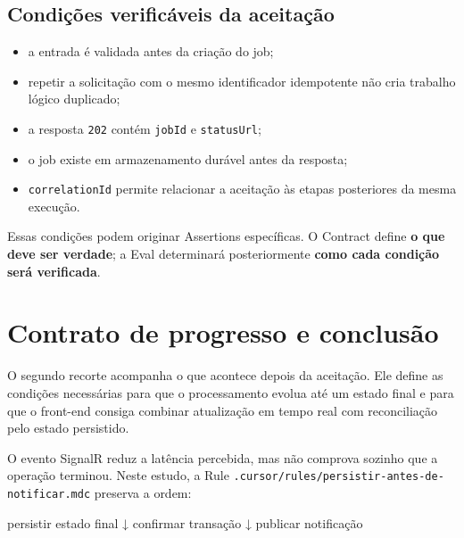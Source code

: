 \documentclass[
  10pt,
  a4paper,
  oneside]{book}
\newenvironment{Shaded}{}{}
\newcommand{\NormalTok}[1]{#1}
\providecommand{\tightlist}{%
  \setlength{\itemsep}{0pt}\setlength{\parskip}{0pt}}
\renewenvironment{Shaded}{\begin{snugshade}}{\end{snugshade}}%
\begin{document}
\hypertarget{condiuxe7uxf5es-verificuxe1veis-da-aceitauxe7uxe3o}{%
\subsection{Condições verificáveis da
aceitação}\label{condiuxe7uxf5es-verificuxe1veis-da-aceitauxe7uxe3o}}

\begin{itemize}
\tightlist
\item
  a entrada é validada antes da criação do job;
\item
  repetir a solicitação com o mesmo identificador idempotente não cria
  trabalho lógico duplicado;
\item
  a resposta \texttt{202} contém \texttt{jobId} e \texttt{statusUrl};
\item
  o job existe em armazenamento durável antes da resposta;
\item
  \texttt{correlationId} permite relacionar a aceitação às etapas
  posteriores da mesma execução.
\end{itemize}

Essas condições podem originar Assertions específicas. O Contract define
\textbf{o que deve ser verdade}; a Eval determinará posteriormente
\textbf{como cada condição será verificada}.

\hypertarget{contrato-de-progresso-e-conclusuxe3o}{%
\section{Contrato de progresso e
conclusão}\label{contrato-de-progresso-e-conclusuxe3o}}

O segundo recorte acompanha o que acontece depois da aceitação. Ele
define as condições necessárias para que o processamento evolua até um
estado final e para que o front-end consiga combinar atualização em
tempo real com reconciliação pelo estado persistido.

O evento SignalR reduz a latência percebida, mas não comprova sozinho
que a operação terminou. Neste estudo, a Rule
\texttt{.cursor/rules/persistir-antes-de-notificar.mdc} preserva a
ordem:

\begin{Shaded}
\begin{Highlighting}[]
\NormalTok{persistir estado final}
\NormalTok{        ↓}
\NormalTok{confirmar transação}
\NormalTok{        ↓}
\NormalTok{publicar notificação}
\end{Highlighting}
\end{Shaded}
\end{document}
